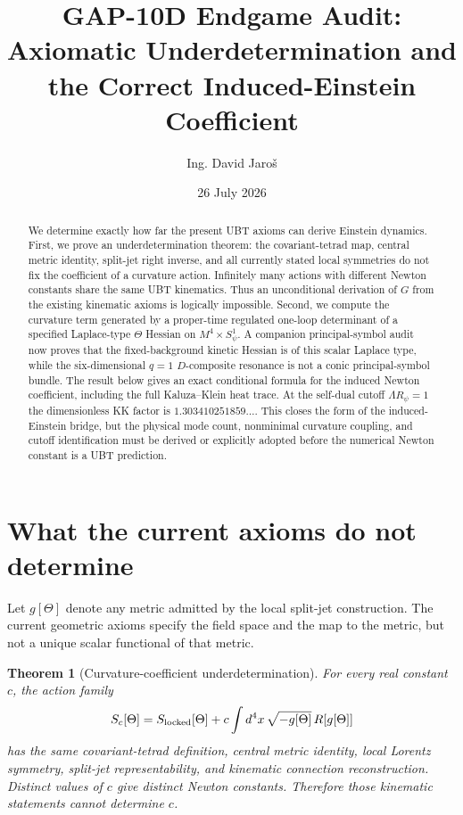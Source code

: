 \documentclass[11pt,a4paper]{article}
\title{GAP-10D Endgame Audit:\\
Axiomatic Underdetermination and the Correct Induced-Einstein Coefficient}
\author{Ing. David Jaro\v{s}}
\date{26 July 2026}
\newtheorem{theorem}{Theorem}
\begin{document}
\maketitle
\UBTProvenanceNotice

\begin{abstract}
We determine exactly how far the present UBT axioms can derive Einstein
dynamics.  First, we prove an underdetermination theorem: the covariant-tetrad
map, central metric identity, split-jet right inverse, and all currently stated
local symmetries do not fix the coefficient of a curvature action.  Infinitely
many actions with different Newton constants share the same UBT kinematics.
Thus an unconditional derivation of $G$ from the existing kinematic axioms is
logically impossible.  Second, we compute the curvature term generated by a
proper-time regulated one-loop determinant of a specified Laplace-type
$\Theta$ Hessian on $M^4\times S^1_\psi$.  A companion principal-symbol audit
now proves that the fixed-background kinetic Hessian is of this scalar
Laplace type, while the six-dimensional $q=1$ $D$-composite resonance is not a
conic principal-symbol bundle.  The result below gives an exact conditional
formula for the induced Newton coefficient, including the full Kaluza--Klein
heat trace.  At the self-dual cutoff $\Lambda R_\psi=1$ the dimensionless KK
factor is $1.303410251859\ldots$.  This closes the form of the induced-Einstein
bridge, but the physical mode count, nonminimal curvature coupling, and cutoff
identification must be derived or explicitly adopted before the numerical
Newton constant is a UBT prediction.
\end{abstract}

\section{What the current axioms do not determine}
Let $g[\Theta]$ denote any metric admitted by the local split-jet construction.
The current geometric axioms specify the field space and the map to the metric,
but not a unique scalar functional of that metric.

\begin{theorem}[Curvature-coefficient underdetermination]\label{thm:under}
For every real constant $c$, the action family
\begin{equation}
 S_c[\Theta]=S_{\rm locked}[\Theta]
 +c\int d^4x\,\sqrt{-g[\Theta]}\,R[g[\Theta]]
 \label{eq:family}
\end{equation}
has the same covariant-tetrad definition, central metric identity, local
Lorentz symmetry, split-jet representability, and kinematic connection
reconstruction.  Distinct values of $c$ give distinct Newton constants.
Therefore those kinematic statements cannot determine $c$.
\end{theorem}
\end{document}
